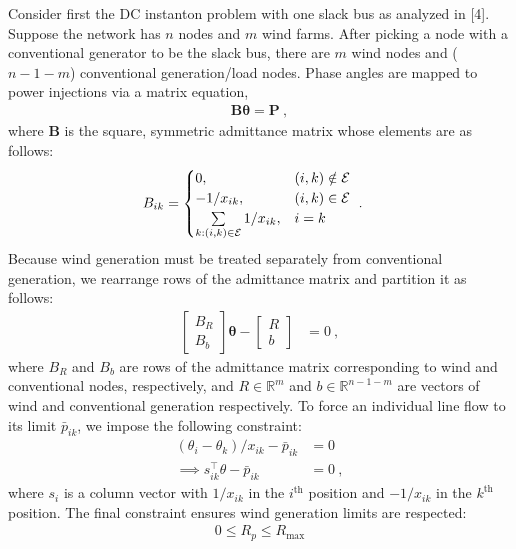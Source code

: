 Consider first the DC instanton problem with one slack bus as analyzed in [4]. Suppose the network has $n$ nodes and $m$ wind farms. After picking a node with a conventional generator to be the slack bus, there are $m$ wind nodes and ($n-1-m$) conventional generation/load nodes. Phase angles are mapped to power injections via a matrix equation, 
$$\begin{align}
\mathbf{B}\mathbf{\theta} = \mathbf{P}~,
\end{align}$$
where $\mathbf{B}$ is the square, symmetric admittance matrix whose elements are as follows:
$$\begin{align}
B_{ik} &= \begin{cases}
0, & (i,k) \notin {\cal E} \\
-1/x_{ik}, & (i,k) \in {\cal E} \\
\sum\limits_{k:(i,k) \in {\cal E}}1/x_{ik}, & i = k
\end{cases}~.
\end{align}$$
Because wind generation must be treated separately from conventional generation, we rearrange rows of the admittance matrix and partition it as follows:
$$\begin{align}
\begin{bmatrix}
B_R \\
B_b
\end{bmatrix} \mathbf{\theta} - \begin{bmatrix}
R \\
b
\end{bmatrix} &= 0~,
\end{align}$$
where $B_R$ and $B_b$ are rows of the admittance matrix corresponding to wind and conventional nodes, respectively, and $R \in \mathbb{R}^m$ and $b \in \mathbb{R}^{n-1-m}$ are vectors of wind and conventional generation respectively. To force an individual line flow to its limit $\bar{p}_{ik}$, we impose the following constraint:
$$\begin{align}
(\theta_i - \theta_k)/x_{ik} - \bar{p}_{ik} &= 0 \\
\nonumber \implies s_{ik}^\top \theta - \bar{p}_{ik} &= 0~,
\end{align}$$
where $s_i$ is a column vector with $1/x_{ik}$ in the $i^\text{th}$ position and $-1/x_{ik}$ in the $k^\text{th}$ position. The final constraint ensures wind generation limits are respected:
$$\begin{align}
 0 \leq R_p \leq R_\text{max}
\end{align}$$


